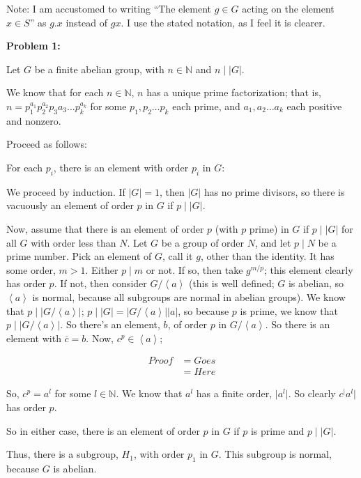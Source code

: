 \documentclass[a4paper,12pt]{article}
\newcommand{\tab}{\hspace{4mm}} %
\newcommand{\absval}[1]{\lvert #1 \rvert}
\newcommand{\anbrack}[1]{\left\langle #1 \right\rangle}
\newcommand{\N}{\mathbb{N}}
\begin{document}
Note: I am accustomed to writing ``The element $g \in G$ acting on the element $x \in S$'' as $g.x$ instead of $gx$. I use the stated notation, as I feel it is clearer.

{\bf Problem 1:}

Let $G$ be a finite abelian group, with $n \in \N$ and $n \mid \absval{G}$.

We know that for each $n \in \N$, $n$ has a unique prime factorization; that is, $n=p_1^{a_1}p_2^{a_2}p_3{a_3}\ldots p_k^{a_k}$ for some $p_1, p_2 \ldots p_k$ each prime, and $a_1, a_2 \ldots a_k$ each positive and nonzero.

Proceed as follows:

\tab For each $p_i$, there is an element with order $p_i$ in $G$:

\tab \tab We proceed by induction. If $\absval{G} =1$, then $\absval{G}$ has no prime divisors, so there is vacuously an element of order $p$ in $G$ if $p \mid \absval{G}$.

\tab \tab Now, assume that there is an element of order $p$ (with $p$ prime) in $G$ if $p \mid \absval{G}$ for all $G$ with order less than $N$. Let $G$ be a group of order $N$, and let $p \mid N$ be a prime number. Pick an element of $G$, call it $g$, other than the identity. It has some order, $m>1$. Either $p \mid m$ or not. If so, then take $g^{m/p}$; this element clearly has order $p$. If not, then consider $G/\anbrack{a}$ (this is well defined; $G$ is abelian, so $\anbrack{a}$ is normal, because all subgroups are normal in abelian groups). We know that $p \mid \absval{G /\anbrack{a}}$; $p \mid \absval{G} = \absval{G/\anbrack{a}}\absval{a}$, so because $p$ is prime, we know that $p \mid \absval{G/\anbrack{a}}$. So there's an element, $b$, of order $p$ in $G/\anbrack{a}$. So there is an element with $\overline{c} = b$. Now, $c^p \in \anbrack{a}$;

\begin{align*}
Proof &= Goes\\
&=Here
\end{align*}

\tab \tab So, $c^p = a^l$ for some $l \in \N$. We know that $a^l$ has a finite order, $\absval{a^l}$. So clearly $c^\absval{a^l}$ has order $p$.

\tab \tab So in either case, there is an element of order $p$ in $G$ if $p$ is prime and $p \mid \absval{G}$.

\tab Thus, there is a subgroup, $H_1$, with order $p_1$ in $G$. This subgroup is normal, because $G$ is abelian. 
\end{document}
